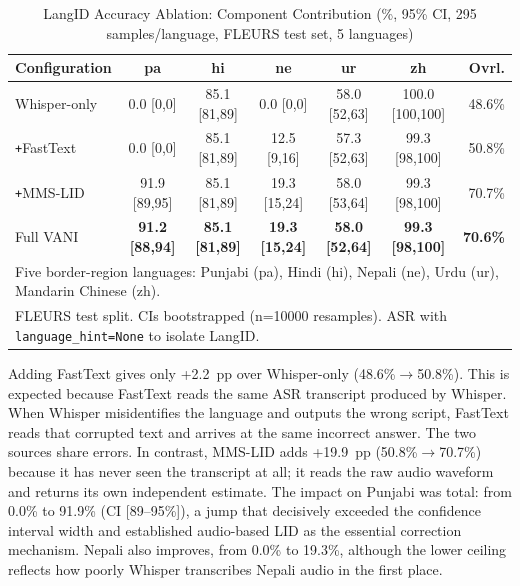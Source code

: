 \documentclass[conference]{IEEEtran}
\begin{document}
\begin{table}[htbp]
\caption{LangID Accuracy Ablation: Component Contribution (\%, 95\% CI, 295 samples/language, FLEURS test set, 5 languages)}
\label{tab:ablation}
\begin{center}
\scriptsize
\begin{tabular}{lcccccr}
\toprule
\textbf{Configuration} & \textbf{pa} & \textbf{hi} & \textbf{ne} & \textbf{ur} & \textbf{zh} & \textbf{Ovrl.} \\
\midrule
Whisper-only & 0.0 [0,0] & 85.1 [81,89] & 0.0 [0,0] & 58.0 [52,63] & 100.0 [100,100] & 48.6\% \\
\texttt{+}FastText & 0.0 [0,0] & 85.1 [81,89] & 12.5 [9,16] & 57.3 [52,63] & 99.3 [98,100] & 50.8\% \\
\texttt{+}MMS-LID & 91.9 [89,95] & 85.1 [81,89] & 19.3 [15,24] & 58.0 [53,64] & 99.3 [98,100] & 70.7\% \\
Full VANI & \textbf{91.2 [88,94]} & \textbf{85.1 [81,89]} & \textbf{19.3 [15,24]} & \textbf{58.0 [52,64]} & \textbf{99.3 [98,100]} & \textbf{70.6\%} \\
\midrule
\multicolumn{7}{l}{\footnotesize Five border-region languages: Punjabi (pa), Hindi (hi), Nepali (ne), Urdu (ur), Mandarin Chinese (zh).} \\
\multicolumn{7}{l}{\footnotesize FLEURS test split. CIs bootstrapped (n=10000 resamples). ASR with \texttt{language\_hint=None} to isolate LangID.} \\
\bottomrule
\end{tabular}
\end{center}
\end{table}

Adding FastText gives only +2.2~pp over Whisper-only (48.6\%$\rightarrow$50.8\%). This is expected because FastText reads the same ASR transcript produced by Whisper. When Whisper misidentifies the language and outputs the wrong script, FastText reads that corrupted text and arrives at the same incorrect answer. The two sources share errors. In contrast, MMS-LID adds +19.9~pp (50.8\%$\rightarrow$70.7\%) because it has never seen the transcript at all; it reads the raw audio waveform and returns its own independent estimate. The impact on Punjabi was total: from 0.0\% to 91.9\% (CI [89--95\%]), a jump that decisively exceeded the confidence interval width and established audio-based LID as the essential correction mechanism. Nepali also improves, from 0.0\% to 19.3\%, although the lower ceiling reflects how poorly Whisper transcribes Nepali audio in the first place.
\end{document}
